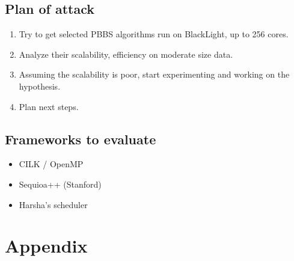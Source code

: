 \documentclass[12pt]{article}
\begin{document}
\subsection{Plan of attack}

\begin{enumerate}

\item Try to get selected PBBS algorithms run on BlackLight, up to 256 cores.


\item Analyze their scalability, efficiency on moderate size data.

\item Assuming the scalability is poor, start experimenting and working on the hypothesis.
 
\item Plan next steps. 

\end{enumerate} 

\subsection{Frameworks to evaluate}

\begin{itemize}
\item CILK / OpenMP
\item Sequioa++ (Stanford)
\item Harsha's scheduler
\end{itemize}
 \newpage
 
 
 \section{Appendix}
 
 
\end{document}
